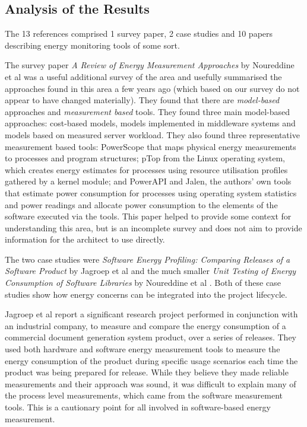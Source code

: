 \subsection{Analysis of the Results}

The 13 references comprised 1 survey paper, 2 case studies and 10 papers describing energy monitoring tools of some sort.

The survey paper \emph{A Review of Energy Measurement Approaches} by Noureddine et al \cite{noureddine2013-energyreview} was a useful additional survey of the area and usefully summarised the approaches found in this area a few years ago (which based on our survey do not appear to have changed materially).  They found that there are \emph{model-based}  approaches and \emph{measurement based} tools.  They found three main model-based approaches: cost-based models, models implemented in middleware systems and models based on measured server workload.  They also found three representative measurement based tools: PowerScope that maps physical energy measurements to processes and program structures; pTop from the Linux operating system, which  
creates energy estimates for processes using resource utilisation profiles gathered by a kernel module; and PowerAPI and Jalen, the authors' own tools that estimate power consumption for processes using operating system statistics and power readings and allocate power consumption to the elements of the software executed via the tools.  This paper helped to provide some context for understanding this area, but is an incomplete survey and does not aim to provide information for the architect to use directly.

The two case studies were \emph{Software Energy Profiling: Comparing Releases of a Software Product} by Jagroep et al \cite{jagroep2016-comparingreleases} and the much smaller \emph{Unit Testing of Energy Consumption of Software Libraries} by Noureddine et al \cite{noureddine2014-energyutest}.  Both of these case studies show how energy concerns can be integrated into the project lifecycle.

Jagroep et al report a significant research project performed in conjunction with an industrial company, to measure and compare the energy consumption of a commercial document generation system product, over a series of releases.  They used both hardware and software energy measurement tools to measure the energy consumption of the product during specific usage scenarios each time the product was being prepared for release.  While they believe they made reliable measurements and their approach was sound, it was difficult to explain many of the process level measurements, which came from the software measurement tools.  This is a cautionary point for all involved in software-based energy measurement.

